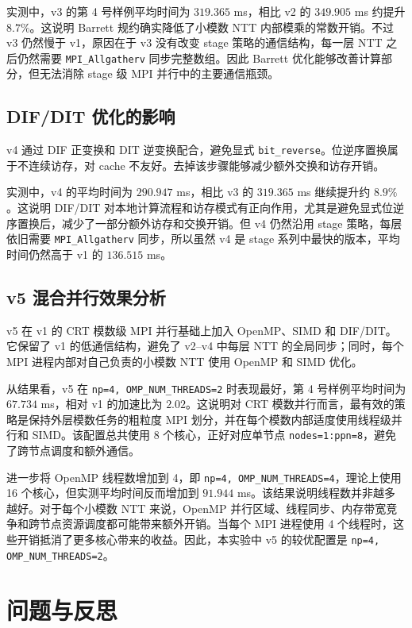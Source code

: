 \documentclass[a4paper]{article}
\begin{document}
实测中，v3 的第 4 号样例平均时间为 $319.365$ ms，相比 v2 的 $349.905$ ms 约提升 $8.7\%$。这说明 Barrett 规约确实降低了小模数 NTT 内部模乘的常数开销。不过 v3 仍然慢于 v1，原因在于 v3 没有改变 stage 策略的通信结构，每一层 NTT 之后仍然需要 \texttt{MPI\_Allgatherv} 同步完整数组。因此 Barrett 优化能够改善计算部分，但无法消除 stage 级 MPI 并行中的主要通信瓶颈。

\subsection{DIF/DIT 优化的影响}

v4 通过 DIF 正变换和 DIT 逆变换配合，避免显式 \texttt{bit\_reverse}。位逆序置换属于不连续访存，对 cache 不友好。去掉该步骤能够减少额外交换和访存开销。

实测中，v4 的平均时间为 $290.947$ ms，相比 v3 的 $319.365$ ms 继续提升约 $8.9\%$。这说明 DIF/DIT 对本地计算流程和访存模式有正向作用，尤其是避免显式位逆序置换后，减少了一部分额外访存和交换开销。但 v4 仍然沿用 stage 策略，每层依旧需要 \texttt{MPI\_Allgatherv} 同步，所以虽然 v4 是 stage 系列中最快的版本，平均时间仍然高于 v1 的 $136.515$ ms。

\subsection{v5 混合并行效果分析}

v5 在 v1 的 CRT 模数级 MPI 并行基础上加入 OpenMP、SIMD 和 DIF/DIT。它保留了 v1 的低通信结构，避免了 v2--v4 中每层 NTT 的全局同步；同时，每个 MPI 进程内部对自己负责的小模数 NTT 使用 OpenMP 和 SIMD 优化。

从结果看，v5 在 \texttt{np=4, OMP\_NUM\_THREADS=2} 时表现最好，第 4 号样例平均时间为 $67.734$ ms，相对 v1 的加速比为 $2.02$。这说明对 CRT 模数并行而言，最有效的策略是保持外层模数任务的粗粒度 MPI 划分，并在每个模数内部适度使用线程级并行和 SIMD。该配置总共使用 8 个核心，正好对应单节点 \texttt{nodes=1:ppn=8}，避免了跨节点调度和额外通信。

进一步将 OpenMP 线程数增加到 4，即 \texttt{np=4, OMP\_NUM\_THREADS=4}，理论上使用 16 个核心，但实测平均时间反而增加到 $91.944$ ms。该结果说明线程数并非越多越好。对于每个小模数 NTT 来说，OpenMP 并行区域、线程同步、内存带宽竞争和跨节点资源调度都可能带来额外开销。当每个 MPI 进程使用 4 个线程时，这些开销抵消了更多核心带来的收益。因此，本实验中 v5 的较优配置是 \texttt{np=4, OMP\_NUM\_THREADS=2}。

\section{问题与反思}
\end{document}
